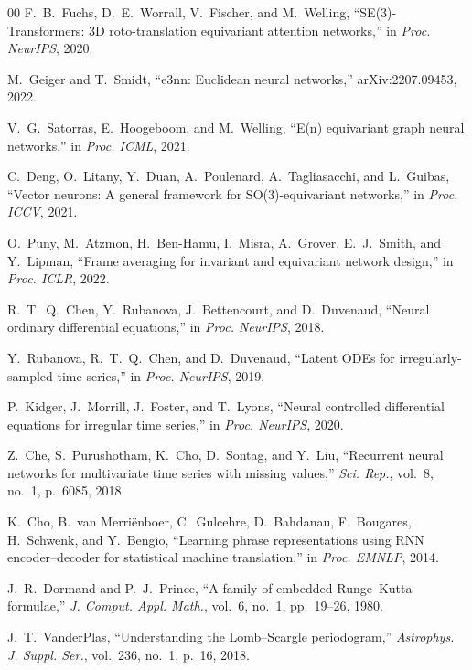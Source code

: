 \documentclass[11pt]{article}
\begin{document}
\begin{thebibliography}{00}
F.~B.~Fuchs, D.~E.~Worrall, V.~Fischer, and M.~Welling,
``SE(3)-Transformers: 3D roto-translation equivariant attention networks,''
in \textit{Proc. NeurIPS}, 2020.

M.~Geiger and T.~Smidt,
``e3nn: Euclidean neural networks,''
arXiv:2207.09453, 2022.

V.~G.~Satorras, E.~Hoogeboom, and M.~Welling,
``E(n) equivariant graph neural networks,''
in \textit{Proc. ICML}, 2021.

C.~Deng, O.~Litany, Y.~Duan, A.~Poulenard, A.~Tagliasacchi, and L.~Guibas,
``Vector neurons: A general framework for SO(3)-equivariant networks,''
in \textit{Proc. ICCV}, 2021.

O.~Puny, M.~Atzmon, H.~Ben-Hamu, I.~Misra, A.~Grover, E.~J.~Smith, and Y.~Lipman,
``Frame averaging for invariant and equivariant network design,''
in \textit{Proc. ICLR}, 2022.

R.~T.~Q.~Chen, Y.~Rubanova, J.~Bettencourt, and D.~Duvenaud,
``Neural ordinary differential equations,''
in \textit{Proc. NeurIPS}, 2018.

Y.~Rubanova, R.~T.~Q.~Chen, and D.~Duvenaud,
``Latent ODEs for irregularly-sampled time series,''
in \textit{Proc. NeurIPS}, 2019.

P.~Kidger, J.~Morrill, J.~Foster, and T.~Lyons,
``Neural controlled differential equations for irregular time series,''
in \textit{Proc. NeurIPS}, 2020.

Z.~Che, S.~Purushotham, K.~Cho, D.~Sontag, and Y.~Liu,
``Recurrent neural networks for multivariate time series with missing values,''
\textit{Sci. Rep.}, vol.~8, no.~1, p.~6085, 2018.

K.~Cho, B.~van Merri\"{e}nboer, C.~Gulcehre, D.~Bahdanau, F.~Bougares, H.~Schwenk, and Y.~Bengio,
``Learning phrase representations using RNN encoder--decoder for statistical machine translation,''
in \textit{Proc. EMNLP}, 2014.

J.~R.~Dormand and P.~J.~Prince,
``A family of embedded Runge--Kutta formulae,''
\textit{J. Comput. Appl. Math.}, vol.~6, no.~1, pp.~19--26, 1980.

J.~T.~VanderPlas,
``Understanding the Lomb--Scargle periodogram,''
\textit{Astrophys. J. Suppl. Ser.}, vol.~236, no.~1, p.~16, 2018.

\end{thebibliography}
\end{document}
